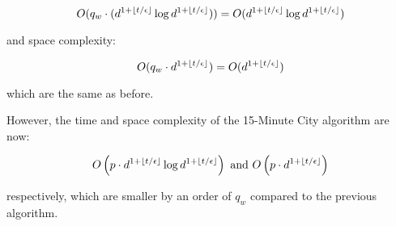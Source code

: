 $$O(q_w\cdot(d^{1+\floor*{t/\epsilon}}\log d^{1+\floor*{t/\epsilon}}))=O(d^{1+\floor*{t/\epsilon}}\log d^{1+\floor*{t/\epsilon}})$$

and space complexity:

$$O(q_w\cdot d^{1+\floor*{t/\epsilon}})=O(d^{1+\floor*{t/\epsilon}})$$

which are the same as before.

However, the time and space complexity of the 15-Minute City algorithm are now:

$$O\left(p\cdot d^{1+\floor*{t/\epsilon}}\log d^{1+\floor*{t/\epsilon}}\right)\text{ and }O\left(p\cdot d^{1+\floor*{t/\epsilon}}\right)$$

respectively, which are smaller by an order of $q_w$ compared to the previous algorithm.
